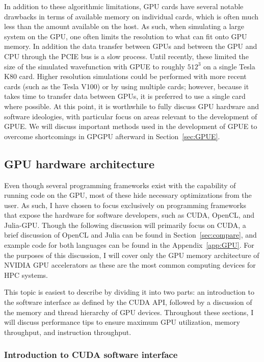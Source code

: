 In addition to these algorithmic limitations, GPU cards have several notable drawbacks in terms of available memory on individual cards, which is often much less than the amount available on the host.
As such, when simulating a large system on the GPU, one often limits the resolution to what can fit onto GPU memory.
In addition the data transfer between GPUs and between the GPU and CPU through the PCIE bus is a slow process.
Until recently, these limited the size of the simulated wavefunction with GPUE to roughly $512^3$ on a single Tesla K80 card.
Higher resolution simulations could be performed with more recent cards (such as the Tesla V100) or by using multiple cards; however, because it takes time to transfer data between GPUs, it is preferred to use a single card where possible.
At this point, it is worthwhile to fully discuss GPU hardware and software ideologies, with particular focus on areas relevant to the development of GPUE.
We will discuss important methods used in the development of GPUE to overcome shortcomings in GPGPU afterward in Section~\ref{sec:GPUE}.

\subsection{GPU hardware architecture}

Even though several programming frameworks exist with the capability of running code on the GPU, most of these hide necessary optimizations from the user.
As such, I have chosen to focus exclusively on programming frameworks that expose the hardware for software developers, such as CUDA, OpenCL, and Julia-GPU.
Though the following discussion will primarily focus on CUDA, a brief discussion of OpenCL and Julia can be found in Section~\ref{sec:compare}, and example code for both languages can be found in the Appendix~\ref{app:GPU}.
For the purposes of this discussion, I will cover only the GPU memory architecture of NVIDIA GPU accelerators as these are the most common computing devices for HPC systems.

This topic is easiest to describe by dividing it into two parts: an introduction to the software interface as defined by the CUDA API, followed by a discussion of the memory and thread hierarchy of GPU devices.
Throughout these sections, I will discuss performance tips to ensure maximum GPU utilization, memory throughput, and instruction throughput.

\subsubsection{Introduction to CUDA software interface}

